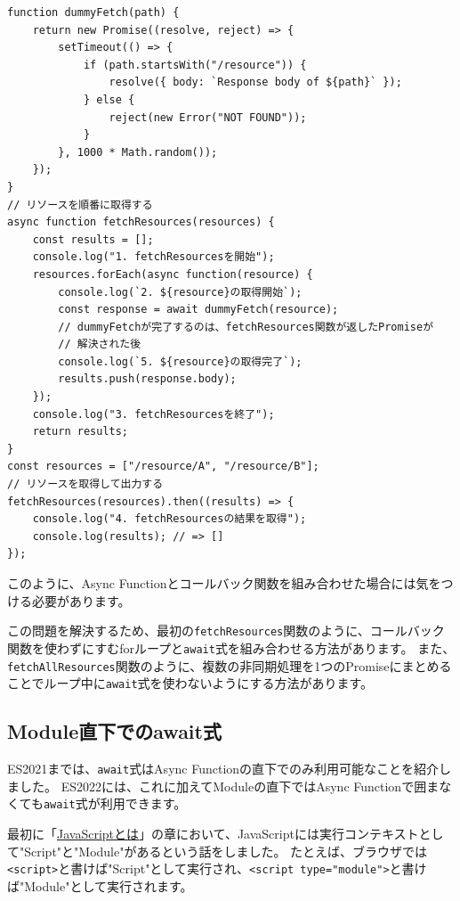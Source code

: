 \begin{lstlisting}
function dummyFetch(path) {
    return new Promise((resolve, reject) => {
        setTimeout(() => {
            if (path.startsWith("/resource")) {
                resolve({ body: `Response body of ${path}` });
            } else {
                reject(new Error("NOT FOUND"));
            }
        }, 1000 * Math.random());
    });
}
// リソースを順番に取得する
async function fetchResources(resources) {
    const results = [];
    console.log("1. fetchResourcesを開始");
    resources.forEach(async function(resource) {
        console.log(`2. ${resource}の取得開始`);
        const response = await dummyFetch(resource);
        // dummyFetchが完了するのは、fetchResources関数が返したPromiseが
        // 解決された後
        console.log(`5. ${resource}の取得完了`);
        results.push(response.body);
    });
    console.log("3. fetchResourcesを終了");
    return results;
}
const resources = ["/resource/A", "/resource/B"];
// リソースを取得して出力する
fetchResources(resources).then((results) => {
    console.log("4. fetchResourcesの結果を取得");
    console.log(results); // => []
});
\end{lstlisting}

このように、Async
Functionとコールバック関数を組み合わせた場合には気をつける必要があります。

この問題を解決するため、最初の\texttt{fetchResources}関数のように、コールバック関数を使わずにすむforループと\texttt{await}式を組み合わせる方法があります。
また、\texttt{fetchAllResources}関数のように、複数の非同期処理を1つのPromiseにまとめることでループ中に\texttt{await}式を使わないようにする方法があります。

\hypertarget{top-level-await-in-module}{%
\subsection{Module直下でのawait式\,\protect{}}\label{top-level-await-in-module}}

ES2021までは、\texttt{await}式はAsync Functionの直下でのみ利用可能なことを紹介しました。
ES2022には、これに加えてModuleの直下ではAsync Functionで囲まなくても\texttt{await}式が利用できます。

最初に「\hyperlink{what-is-javascript}{JavaScriptとは}」の章において、JavaScriptには実行コンテキストとして"Script"と"Module"があるという話をしました。
たとえば、ブラウザでは\texttt{<script>}と書けば"Script"として実行され、\texttt{<script type="module">}と書けば"Module"として実行されます。

